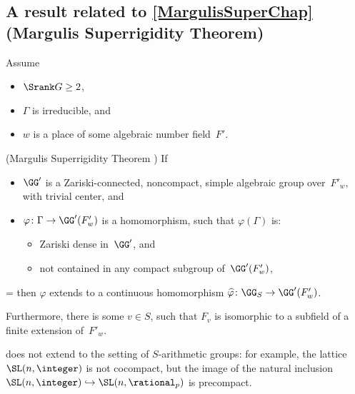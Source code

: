 \subsection*{A result related to \cref{MargulisSuperChap} (Margulis Superrigidity Theorem)}

\begin{assump*}
Assume 
	\begin{itemize}
	\item $\Srank G \ge 2$, 
	\item $\Gamma$ is irreducible,
	and
	\item $w$ is a place of some algebraic number field~$F'$.
	\end{itemize}
\end{assump*}

	\begin{slist}
	 (Margulis Superrigidity Theorem
	\cite[Prop.~VII.5.3, p.~225]{MargulisBook})
	If
		\begin{itemize} \parindent %
		\item $\GG'$ is a Zariski-connected, noncompact, simple algebraic group over~$F'_w$, with trivial center, 
		and
		\item $\varphi \colon \Gamma \to \GG'(F'_w)$ is a homomorphism, such that $\varphi(\Gamma)$ is:
			\begin{itemize}  \leftskip = 2em %
			\item Zariski dense in~$\GG'$,
			and \par
			\item not contained in any compact subgroup of~$\GG'(F'_w)$,
			\end{itemize}
		\end{itemize}
\leftskip=\sindent %
	then $\varphi$ extends to a continuous homomorphism $\widehat\varphi \colon \GG_S \to \GG'(F'_w)$. \par

\smallskip

Furthermore,  there is some $v \in S$, such that $F_v$ is isomorphic to a subfield of a finite extension of~$F'_w$.
	

	\end{slist}

\begin{warn*}
 does not extend to the setting of $S$-arithmetic groups: for example,
the lattice $\SL(n,\integer)$ is not cocompact, but the image of the natural inclusion $\SL(n,\integer) \hookrightarrow \SL(n,\rational_p)$ is precompact.
\end{warn*}





